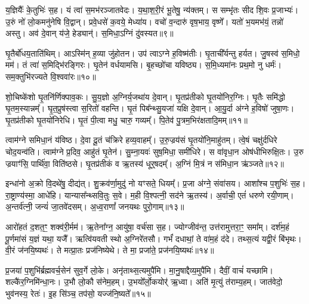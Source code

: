 य॒ज्ञियैः᳚ के॒तुभिः॑ स॒ह।
यं त्वा॑ स॒मभ॑रञ्जातवेदः।
य॒था॒श॒री॒रं भू॒तेषु॒ न्य॑क्तम्।
स सम्भृ॑तः सीद शि॒वः प्र॒जाभ्यः॑।
उ॒रुं नो॑ लो॒कमनु॑नेषि वि॒द्वान्।
प्रवे॒धसे॑ क॒वये॒ मेध्या॑य।
वचो॑ व॒न्दारु॑ वृष॒भाय॒ वृष्णे᳚।
यतो॑ भ॒यमभ॑यं॒ तन्नो॑ अस्तु।
अव॑ दे॒वान् य॑जे॒ हेड्यान्॑।
स॒मिधा॒\-ऽग्निं दु॑वस्यत॥९॥\ip


घृ॒तैर्बो॑धय॒ताति॑थिम्।
आऽस्मि॑न् ह॒व्या जु॑होतन।
उप॑ त्वा\-ऽग्ने ह॒विष्म॑तीः।
घृ॒ताची᳚र्यन्तु हर्यत।
जु॒षस्व॑ स॒मिधो॒ मम॑।
तं त्वा॑ स॒मिद्भि॑रङ्गिरः।
घृ॒तेन॑ वर्धयामसि।
बृ॒हच्छो॑चा यविष्ठ्य।
स॒मि॒ध्यमा॑नः प्रथ॒मो नु धर्मः॑।
सम॒क्तुभि॑रज्यते वि॒श्ववा॑रः॥१०॥\ip

शो॒चिष्के॑शो घृ॒तनि॑र्णिक्पाव॒कः।
सु॒य॒ज्ञो अ॒ग्निर्य॒जथा॑य दे॒वान्।
घृ॒तप्र॑तीको घृ॒तयो॑निर॒ग्निः।
घृ॒तैः समि॑द्धो घृ॒तम॒स्यान्नम्᳚।
घृ॒त॒प्रुष॑स्त्वा स॒रितो॑ वहन्ति।
घृ॒तं पिब᳚न्थ्सु॒यजा॑ यक्षि दे॒वान्।
आ॒यु॒र्दा अ॑ग्ने ह॒विषो॑ जुषा॒णः।
घृ॒तप्र॑तीको घृ॒तयो॑निरेधि।
घृ॒तं पी॒त्वा मधु॒ चारु॒ गव्यम्᳚।
पि॒तेव॑ पु॒त्रम॒भिर॑क्षतादि॒मम्॥११॥\ip

{\small \closesub{}}

त्वाम॑ग्ने समिधा॒नं य॑विष्ठ।
दे॒वा दू॒तं च॑क्रिरे हव्य॒वाहम्᳚।
उ॒रु॒ज्रय॑सं घृ॒तयो॑नि॒माहु॑तम्।
त्वे॒षं चक्षु॑र्दधिरे चोद॒यन्व॑ति।
त्वाम॑ग्ने प्र॒दिव॒ आहु॑तं घृ॒तेन॑।
सु॒म्ना॒यवः॑ सुष॒मिधा॒ समी॑धिरे।
स वा॑वृधा॒न ओष॑धीभिरुक्षि॒तः।
उ॒रु ज्रयाꣳ॑सि॒ पार्थि॑वा॒ विति॑ष्ठसे।
घृ॒तप्र॑तीकं व ऋ॒तस्य॑ धूर्॒षदम्᳚।
अ॒ग्निं मि॒त्रं न स॑मिधा॒न ऋ॑ञ्जते॥१२॥\ip

इन्धा॑नो अ॒क्रो वि॒दथे॑षु॒ दीद्य॑त्।
शु॒क्रव॑र्णा॒मुदु॑ नो यꣳसते॒ धियम्᳚।
प्र॒जा अ॑ग्ने॒ संवा॑सय।
आशा᳚श्च प॒शुभिः॑ स॒ह।
रा॒ष्ट्राण्य॑स्मा॒ आधे॑हि।
यान्यास᳚न्थ्सवि॒तुः स॒वे।
म॒ही वि॒श्पत्नी॒ सद॑ने ऋ॒तस्य॑।
अ॒र्वाची॒ एतं॑ धरुणे रयी॒णाम्।
अ॒न्तर्व॑त्नी॒ जन्यं॑ जा॒तवे॑दसम्।
अ॒ध्व॒राणां᳚ जनयथः पुरो॒गाम्॥१३॥\ip

आरो॑हतं द॒शत॒ꣳ॒ शक्व॑री॒र्मम॑।
ऋ॒तेना᳚ग्न॒ आयु॑षा॒ वर्च॑सा स॒ह।
ज्योग्जीव॑न्त॒ उत्त॑रामुत्तरा॒ꣳ॒ समा᳚म्।
दर्\mbox{}श॑म॒हं पू॒र्णमा॑सं य॒ज्ञं यथा॒ यजै᳚।
ऋत्वि॑यवती स्थो अ॒ग्निरे॑तसौ।
गर्भं॑ दधाथां॒ ते वा॑म॒हं द॑दे।
तथ्स॒त्यं यद्वी॒रं बि॑भृथः।
वी॒रं ज॑नयि॒ष्यथः॑।
ते मत्प्रा॒तः प्रज॑निष्येथे।
ते मा॒ प्रजा॑ते॒ प्रज॑नयि॒ष्यथः॑॥१४॥\ip

प्र॒जया॑ प॒शुभि॑र्ब्रह्मवर्च॒सेन॑ सुव॒र्गे लो॒के।
अनृ॑ताथ्स॒त्य\-मुपै॑मि।
मा॒नु॒षाद्दैव्य॒मुपै॑मि।
दैवीं॒ वाचं॑ यच्छामि।
शल्कै॑र॒ग्निमि॑न्धा॒नः।
उ॒भौ लो॒कौ स॑नेम॒हम्।
उ॒भयो᳚र्लो॒कयोर्॑ ऋ॒ध्वा।
अति॑ मृ॒त्युं त॑राम्य॒हम्।
जात॑वेदो॒ भुव॑नस्य॒ रेतः॑।
इ॒ह सि॑ञ्च॒ तप॑सो॒ यज्ज॑नि॒ष्यते᳚॥१५॥\ip

